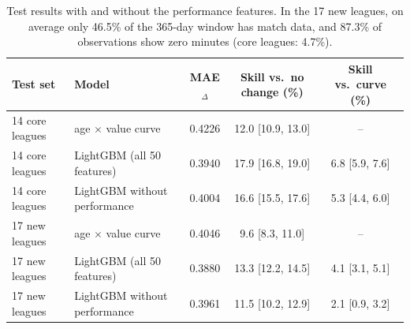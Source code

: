 \begin{table}[!h]
\centering
\caption{Test results with and without the performance features. In the 17 new leagues, on average only 46.5\% of the 365-day window has match data, and 87.3\% of observations show zero minutes (core leagues: 4.7\%).}
\label{tab:s-newleagues}
\footnotesize
\begin{tabular}{llccc}
\toprule
Test set & Model & MAE$_\Delta$ & Skill vs.\ no change (\%) & Skill vs.\ curve (\%) \\
\midrule
14 core leagues & age $\times$ value curve & 0.4226 & 12.0 [10.9, 13.0] & -- \\
14 core leagues & LightGBM (all 50 features) & 0.3940 & 17.9 [16.8, 19.0] & 6.8 [5.9, 7.6] \\
14 core leagues & LightGBM without performance & 0.4004 & 16.6 [15.5, 17.6] & 5.3 [4.4, 6.0] \\
\midrule
17 new leagues & age $\times$ value curve & 0.4046 & 9.6 [8.3, 11.0] & -- \\
17 new leagues & LightGBM (all 50 features) & 0.3880 & 13.3 [12.2, 14.5] & 4.1 [3.1, 5.1] \\
17 new leagues & LightGBM without performance & 0.3961 & 11.5 [10.2, 12.9] & 2.1 [0.9, 3.2] \\
\bottomrule
\end{tabular}
\end{table}
